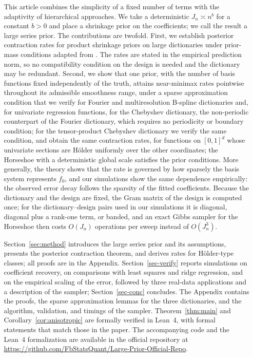 This article combines the simplicity of a fixed number of terms with the adaptivity of hierarchical approaches. We take a deterministic $J_n\asymp n^{b}$ for a constant $b>0$ and place a shrinkage prior on the coefficients; we call the result a large series prior. The contributions are twofold. First, we establish posterior contraction rates for product shrinkage priors on large dictionaries under prior-mass conditions adapted from \citet{WeiGhosal2020}. The rates are stated in the empirical prediction norm, so no compatibility condition on the design is needed and the dictionary may be redundant. Second, we show that one prior, with the number of basis functions fixed independently of the truth, attains near-minimax rates pointwise throughout its admissible smoothness range, under a sparse approximation condition that we verify for Fourier and multiresolution B-spline dictionaries and, for univariate regression functions, for the Chebyshev dictionary, the non-periodic counterpart of the Fourier dictionary, which requires no periodicity or boundary condition; for the tensor-product Chebyshev dictionary we verify the same condition, and obtain the same contraction rates, for functions on $[0,1]^d$ whose univariate sections are H\"older uniformly over the other coordinates; the Horseshoe with a deterministic global scale satisfies the prior conditions. More generally, the theory shows that the rate is governed by how sparsely the basis system represents $f_0$, and our simulations show the same dependence empirically: the observed error decay follows the sparsity of the fitted coefficients. Because the dictionary and the design are fixed, the Gram matrix of the design is computed once; for the dictionary--design pairs used in our simulations it is diagonal, diagonal plus a rank-one term, or banded, and an exact Gibbs sampler for the Horseshoe then costs $O(J_n)$ operations per sweep instead of $O(J_n^3)$.

Section~\ref{sec:method} introduces the large series prior and its assumptions, presents the posterior contraction theorem, and derives rates for H\"older-type classes; all proofs are in the Appendix. Section~\ref{sec-verify} reports simulations on coefficient recovery, on comparisons with least squares and ridge regression, and on the empirical scaling of the error, followed by three real-data applications and a description of the sampler; Section~\ref{sec-conc} concludes. The Appendix contains the proofs, the sparse approximation lemmas for the three dictionaries, and the algorithm, validation, and timings of the sampler. Theorem~\ref{thm:main} and Corollary~\ref{cor:anisotropic} are formally verified in Lean~4, with formal statements that match those in the paper. The accompanying code and the Lean~4 formalization are available in the official repository at \url{https://github.com/FbStatsQuant/Large-Prior-Official-Repo}.


